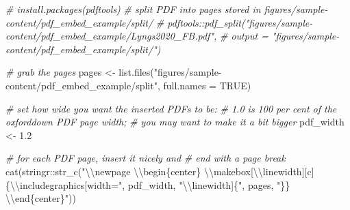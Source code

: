\documentclass[a4paper, nobind]{templates/ociamthesis}
\newenvironment{Shaded}{\begin{snugshade}}{\end{snugshade}}
\newcommand{\AttributeTok}[1]{\textcolor[rgb]{0.77,0.63,0.00}{#1}}
\newcommand{\CommentTok}[1]{\textcolor[rgb]{0.56,0.35,0.01}{\textit{#1}}}
\newcommand{\ConstantTok}[1]{\textcolor[rgb]{0.00,0.00,0.00}{#1}}
\newcommand{\FloatTok}[1]{\textcolor[rgb]{0.00,0.00,0.81}{#1}}
\newcommand{\FunctionTok}[1]{\textcolor[rgb]{0.00,0.00,0.00}{#1}}
\newcommand{\NormalTok}[1]{#1}
\newcommand{\OtherTok}[1]{\textcolor[rgb]{0.56,0.35,0.01}{#1}}
\newcommand{\SpecialCharTok}[1]{\textcolor[rgb]{0.00,0.00,0.00}{#1}}
\newcommand{\StringTok}[1]{\textcolor[rgb]{0.31,0.60,0.02}{#1}}
\renewenvironment{Shaded}
{
  \vspace{10pt}%
  \begin{snugshade}%
}{%
  \end{snugshade}%
  \vspace{8pt}%
}
\begin{document}
\begin{Shaded}
\begin{Highlighting}[]
\CommentTok{\# install.packages(pdftools)}
\CommentTok{\# split PDF into pages stored in figures/sample{-}content/pdf\_embed\_example/split/}
\CommentTok{\# pdftools::pdf\_split("figures/sample{-}content/pdf\_embed\_example/Lyngs2020\_FB.pdf",}
\CommentTok{\#        output = "figures/sample{-}content/pdf\_embed\_example/split/")}

\CommentTok{\# grab the pages}
\NormalTok{pages }\OtherTok{\textless{}{-}} \FunctionTok{list.files}\NormalTok{(}\StringTok{"figures/sample{-}content/pdf\_embed\_example/split"}\NormalTok{, }\AttributeTok{full.names =} \ConstantTok{TRUE}\NormalTok{)}

\CommentTok{\# set how wide you want the inserted PDFs to be: }
\CommentTok{\# 1.0 is 100 per cent of the oxforddown PDF page width;}
\CommentTok{\# you may want to make it a bit bigger}
\NormalTok{pdf\_width }\OtherTok{\textless{}{-}} \FloatTok{1.2}

\CommentTok{\# for each PDF page, insert it nicely and}
\CommentTok{\# end with a page break}
\FunctionTok{cat}\NormalTok{(stringr}\SpecialCharTok{::}\FunctionTok{str\_c}\NormalTok{(}\StringTok{"}\SpecialCharTok{\textbackslash{}\textbackslash{}}\StringTok{newpage }\SpecialCharTok{\textbackslash{}\textbackslash{}}\StringTok{begin\{center\} }\SpecialCharTok{\textbackslash{}\textbackslash{}}\StringTok{makebox[}\SpecialCharTok{\textbackslash{}\textbackslash{}}\StringTok{linewidth][c]\{}\SpecialCharTok{\textbackslash{}\textbackslash{}}\StringTok{includegraphics[width="}\NormalTok{, pdf\_width, }\StringTok{"}\SpecialCharTok{\textbackslash{}\textbackslash{}}\StringTok{linewidth]\{"}\NormalTok{, pages, }\StringTok{"\}\} }\SpecialCharTok{\textbackslash{}\textbackslash{}}\StringTok{end\{center\}"}\NormalTok{))}
\end{Highlighting}
\end{Shaded}
\end{document}
